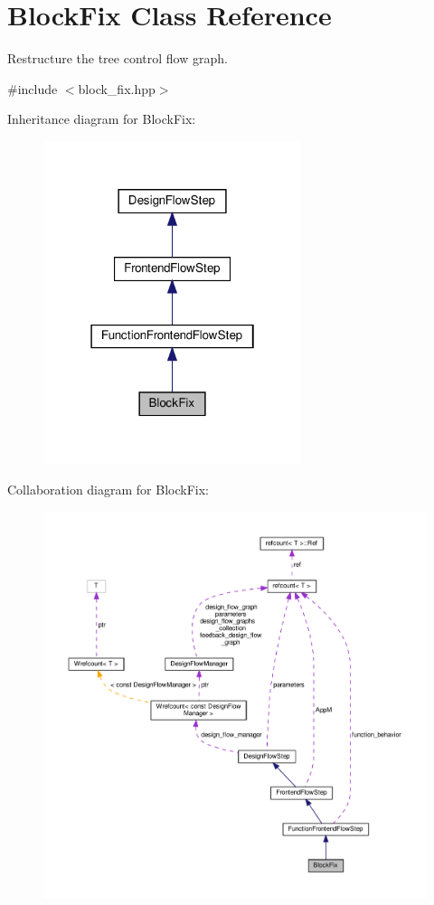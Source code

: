 \hypertarget{classBlockFix}{}\section{Block\+Fix Class Reference}
\label{classBlockFix}


Restructure the tree control flow graph.  




{\ttfamily \#include $<$block\+\_\+fix.\+hpp$>$}



Inheritance diagram for Block\+Fix\+:
\nopagebreak
\begin{figure}[H]
\begin{center}
\leavevmode
\includegraphics[width=214pt]{d3/d21/classBlockFix__inherit__graph}
\end{center}
\end{figure}


Collaboration diagram for Block\+Fix\+:
\nopagebreak
\begin{figure}[H]
\begin{center}
\leavevmode
\includegraphics[width=350pt]{df/dc8/classBlockFix__coll__graph}
\end{center}
\end{figure}
